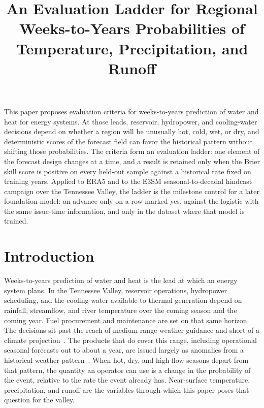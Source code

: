 \documentclass{ametsocV6.2}
\title{An Evaluation Ladder for Regional Weeks-to-Years Probabilities of Temperature, Precipitation, and Runoff}
\affiliation{\aff{a}{Oak Ridge National Laboratory, Oak Ridge, Tennessee}}
\begin{document}
\maketitle

\sigstatement
This paper proposes evaluation criteria for weeks-to-years prediction of water and heat for energy systems.
At those leads, reservoir, hydropower, and cooling-water decisions depend on whether a region will be unusually hot, cold, wet, or dry, and deterministic scores of the forecast field can favor the historical pattern without shifting those probabilities.
The criteria form an evaluation ladder: one element of the forecast design changes at a time, and a result is retained only when the Brier skill score is positive on every held-out sample against a historical rate fixed on training years.
Applied to ERA5 and to the E3SM seasonal-to-decadal hindcast campaign over the Tennessee Valley, the ladder is the milestone control for a later foundation model: an advance only on a row marked yes, against the logistic with the same issue-time information, and only in the dataset where that model is trained.

\section{Introduction}
\label{sec:intro}

Weeks-to-years prediction of water and heat is the lead at which an energy system plans.
In the Tennessee Valley, reservoir operations, hydropower scheduling, and the cooling water available to thermal generation depend on rainfall, streamflow, and river temperature over the coming season and the coming year.
Fuel procurement and maintenance are set on that same horizon.
The decisions sit past the reach of medium-range weather guidance and short of a climate projection~\citep{vitart2017s2s,saha2014cfsv2}.
The products that do cover this range, including operational seasonal forecasts out to about a year, are issued largely as anomalies from a historical weather pattern~\citep{saha2014cfsv2,johnson2019seas5}.
When hot, dry, and high-flow seasons depart from that pattern, the quantity an operator can use is a change in the probability of the event, relative to the rate the event already has.
Near-surface temperature, precipitation, and runoff are the variables through which this paper poses that question for the valley.
\end{document}
